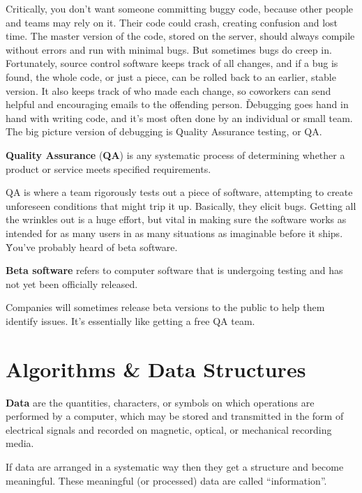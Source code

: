 Critically, you don't want someone committing buggy code, because other people and teams may rely on it. Their code
could crash, creating confusion and lost time. The master version of the code, stored on the server, should always
compile without errors and run with minimal bugs. But sometimes bugs do creep in. Fortunately, source control
software keeps track of all changes, and if a bug is found, the whole code, or just a piece, can be rolled back to an
earlier, stable version. It also keeps track of who made each change, so coworkers can send helpful and encouraging
emails to the offending person. \v

Debugging goes hand in hand with writing code, and it's most often done by an individual or small team. The big
picture version of debugging is Quality Assurance testing, or QA.

\textbf{Quality Assurance} (\textbf{QA}) is any systematic process of determining whether a product or service meets
specified requirements.
\ed

QA is where a team rigorously tests out a piece of software, attempting to create unforeseen conditions that might
trip it up. Basically, they elicit bugs. Getting all the wrinkles out is a huge effort, but vital in making sure the
software works as intended for as many users in as many situations as imaginable before it ships. \v

You've probably heard of beta software.

\textbf{Beta software} refers to computer software that is undergoing testing and has not yet been officially
released.
\ed

Companies will sometimes release beta versions to the public to help them identify issues. It's essentially like
getting a free QA team.

\section{Algorithms \& Data Structures}

\bd[Data]
\textbf{Data} are the quantities, characters, or symbols on which operations are performed by a computer, which may
be stored and transmitted in the form of electrical signals and recorded on magnetic, optical, or mechanical
recording media.
\ed

If data are arranged in a systematic way then they get a structure and become meaningful. These meaningful (or
processed) data are called ``information''.

